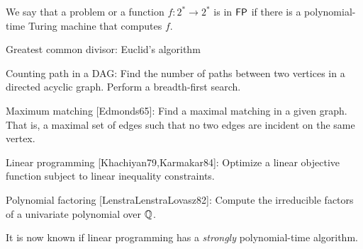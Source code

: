\begin{definition}[$\FP$] \label{def:FP}
    We say that a problem or a function $f\colon 2^* \to 2^*$ is
    in $\FP$ if there is a polynomial-time Turing machine that computes $f$.
\end{definition}
\begin{examples}
    \item Greatest common divisor: Euclid's algorithm
    \item Counting path in a DAG: Find the number of paths between two
        vertices in a directed acyclic graph.
        Perform a breadth-first search.
    \item Maximum matching [Edmonds65]:
        Find a maximal matching in a given graph.
        That is, a maximal set of edges such that no two edges are incident
        on the same vertex.
    \item Linear programming [Khachiyan79,Karmakar84]: Optimize a linear
        objective function subject to linear inequality constraints.
    \item Polynomial factoring [LenstraLenstraLovasz82]:
        Compute the irreducible factors of a univariate polynomial over
        $\mathbb{Q}$.
\end{examples}
It is now known if linear programming has a \emph{strongly} polynomial-time
algorithm.

